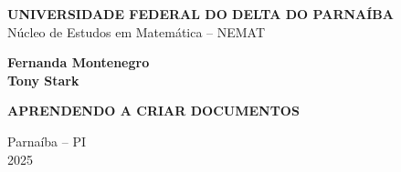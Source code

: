 \documentclass[12pt,a4paper]{article}
\begin{document}
\begin{titlepage}
    \begin{center}
        \onehalfspacing

        \textbf{UNIVERSIDADE FEDERAL DO DELTA DO PARNAÍBA} \\
        Núcleo de Estudos em Matemática – NEMAT

        \vspace{4cm}
        \textbf{Fernanda Montenegro} \\
        \textbf{Tony Stark}

        \vspace{4cm}
        \textbf{\LARGE APRENDENDO A CRIAR DOCUMENTOS}



        \vfill
        Parnaíba – PI \\
        2025
    \end{center}
\end{titlepage}
\end{document}
